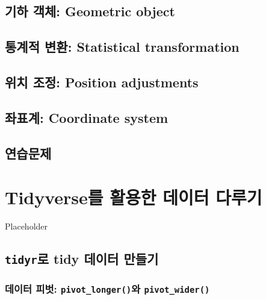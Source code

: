 \documentclass[
]{book}
\begin{document}
\hypertarget{uxae30uxd558-uxac1duxccb4-geometric-object}{%
\section{기하 객체: Geometric object}\label{uxae30uxd558-uxac1duxccb4-geometric-object}}

\hypertarget{uxd1b5uxacc4uxc801-uxbcc0uxd658-statistical-transformation}{%
\section{통계적 변환: Statistical transformation}\label{uxd1b5uxacc4uxc801-uxbcc0uxd658-statistical-transformation}}

\hypertarget{uxc704uxce58-uxc870uxc815-position-adjustments}{%
\section{위치 조정: Position adjustments}\label{uxc704uxce58-uxc870uxc815-position-adjustments}}

\hypertarget{uxc88cuxd45cuxacc4-coordinate-system}{%
\section{좌표계: Coordinate system}\label{uxc88cuxd45cuxacc4-coordinate-system}}

\hypertarget{uxc5f0uxc2b5uxbb38uxc81c-3}{%
\section{연습문제}\label{uxc5f0uxc2b5uxbb38uxc81c-3}}

\hypertarget{ch6}{%
\chapter{Tidyverse를 활용한 데이터 다루기}\label{ch6}}

Placeholder

\hypertarget{tidyruxb85c-tidy-uxb370uxc774uxd130-uxb9ccuxb4e4uxae30}{%
\section{\texorpdfstring{\texttt{tidyr}로 tidy 데이터 만들기}{tidyr로 tidy 데이터 만들기}}\label{tidyruxb85c-tidy-uxb370uxc774uxd130-uxb9ccuxb4e4uxae30}}

\hypertarget{uxb370uxc774uxd130-uxd53cuxbc97-pivot_longeruxc640-pivot_wider}{%
\subsection{\texorpdfstring{데이터 피벗: \texttt{pivot\_longer()}와 \texttt{pivot\_wider()}}{데이터 피벗: pivot\_longer()와 pivot\_wider()}}\label{uxb370uxc774uxd130-uxd53cuxbc97-pivot_longeruxc640-pivot_wider}}
\end{document}
